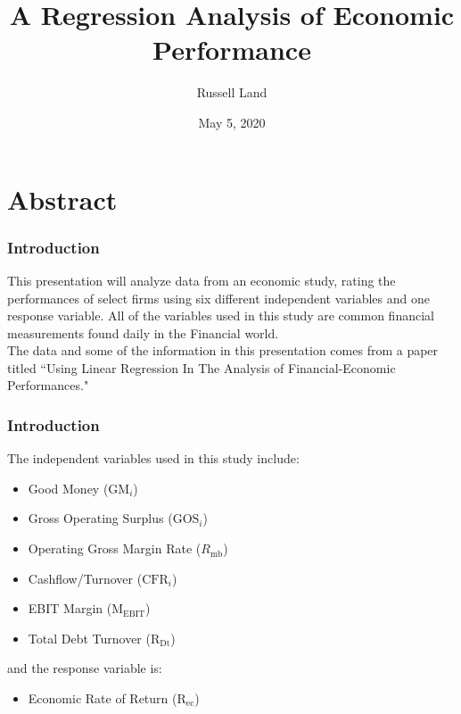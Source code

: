 \documentclass[12pt]{beamer}
\author{Russell Land}
\title{A Regression Analysis of Economic Performance}
\institute{Georgia Southern University}
\date{May 5, 2020}
\begin{document}
\begin{frame}
\titlepage
\end{frame}

\begin{frame}
\tableofcontents
\end{frame}

\section{Abstract}
\begin{frame}
\frametitle{Introduction}
This presentation will analyze data from an economic study, rating the performances of select firms using six different independent variables and one response variable. All of the variables used in this study are common financial measurements found daily in the Financial world.\\[3mm]
The data and some of the information in this presentation comes from a paper titled ``Using Linear Regression In The Analysis of Financial-Economic Performances." \cite{paper}
\end{frame}

\begin{frame}
\frametitle{Introduction}
The independent variables used in this study include:
\begin{itemize}
\item Good Money ($\text{GM}_i$)
\item Gross Operating Surplus ($\text{GOS}_i$)
\item Operating Gross Margin Rate ($R_{\text{mb}}$)
\item Cashflow/Turnover ($\text{CFR}_i$)
\item EBIT Margin ($\text{M}_{\text{EBIT}}$)
\item Total Debt Turnover ($\text{R}_{\text{Dt}}$)
\end{itemize}
and the response variable is:
\begin{itemize}
\item Economic Rate of Return ($\text{R}_{\text{ec}}$)
\end{itemize}
\end{frame}
\end{document}
